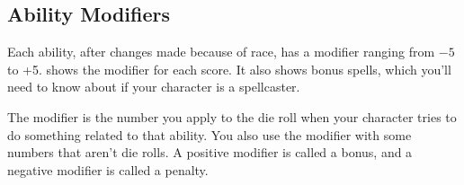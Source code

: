 


\subsection{Ability Modifiers}

Each ability, after changes made because of race, has a modifier ranging from $-5$ to +5.  shows the modifier for each score. It also shows bonus spells, which you'll need to know about if your character is a spellcaster.

The modifier is the number you apply to the die roll when your character tries to do something related to that ability. You also use the modifier with some numbers that aren't die rolls. A positive modifier is called a bonus, and a negative modifier is called a penalty.

